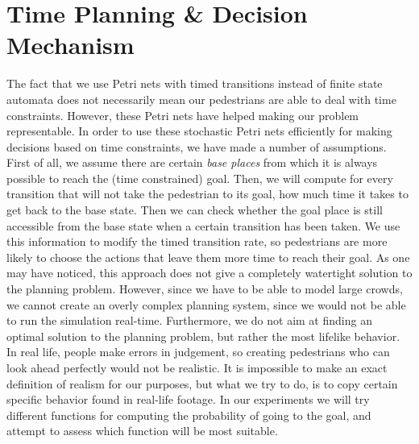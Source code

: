 \documentclass[11pt, a4paper]{book}
\begin{document}
\section{Time Planning \& Decision Mechanism}
\label{timeplanning}
The fact that we use Petri nets with timed transitions instead of finite state automata does not necessarily mean our pedestrians are able to deal with time constraints. However, these Petri nets have helped making our problem representable. In order to use these stochastic Petri nets efficiently for making decisions based on time constraints, we have made a number of assumptions.\\
First of all, we assume there are certain \emph{base places} from which it is always possible to reach the (time constrained) goal. Then, we will compute for every transition that will not take the pedestrian to its goal, how much time it takes to get back to the base state. Then we can check whether the goal place is still accessible from the base state when a certain transition has been taken. We use this information to modify the timed transition rate, so pedestrians are more likely to choose the actions that leave them more time to reach their goal.
As one may have noticed, this approach does not give a completely watertight solution to the planning problem. However, since we have to be able to model large crowds, we cannot create an overly complex planning system, since we would not be able to run the simulation real-time. Furthermore, we do not aim at finding an optimal solution to the planning problem, but rather the most lifelike behavior. In real life, people make errors in judgement, so creating pedestrians who can look ahead perfectly would not be realistic. It is impossible to make an exact definition of realism for our purposes, but what we try to do, is to copy certain specific behavior found in real-life footage. In our experiments we will try different functions for computing the probability of going to the goal, and attempt to assess which function will be most suitable.
\end{document}
